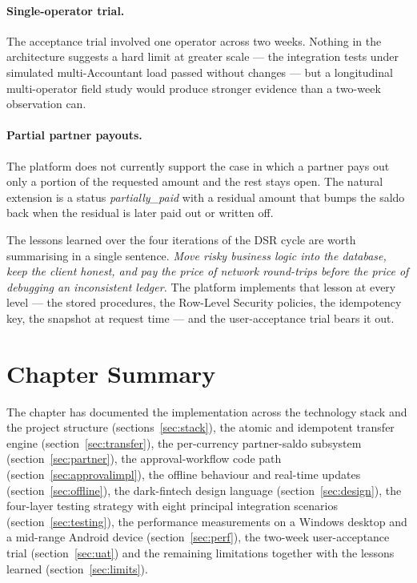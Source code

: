 \paragraph{Single-operator trial.}
The acceptance trial involved one operator across two weeks. Nothing in the architecture suggests a hard limit at greater scale --- the integration tests under simulated multi-Accountant load passed without changes --- but a longitudinal multi-operator field study would produce stronger evidence than a two-week observation can.

\paragraph{Partial partner payouts.}
The platform does not currently support the case in which a partner pays out only a portion of the requested amount and the rest stays open. The natural extension is a status \emph{partially\_paid} with a residual amount that bumps the saldo back when the residual is later paid out or written off.

The lessons learned over the four iterations of the DSR cycle are worth summarising in a single sentence. \emph{Move risky business logic into the database, keep the client honest, and pay the price of network round-trips before the price of debugging an inconsistent ledger.} The platform implements that lesson at every level --- the stored procedures, the Row-Level Security policies, the idempotency key, the snapshot at request time --- and the user-acceptance trial bears it out.

\section{Chapter Summary}
\label{sec:ch3summary}

The chapter has documented the implementation across the technology stack and the project structure (sections~\ref{sec:stack}), the atomic and idempotent transfer engine (section~\ref{sec:transfer}), the per-currency partner-saldo subsystem (section~\ref{sec:partner}), the approval-workflow code path (section~\ref{sec:approvalimpl}), the offline behaviour and real-time updates (section~\ref{sec:offline}), the dark-fintech design language (section~\ref{sec:design}), the four-layer testing strategy with eight principal integration scenarios (section~\ref{sec:testing}), the performance measurements on a Windows desktop and a mid-range Android device (section~\ref{sec:perf}), the two-week user-acceptance trial (section~\ref{sec:uat}) and the remaining limitations together with the lessons learned (section~\ref{sec:limits}).

